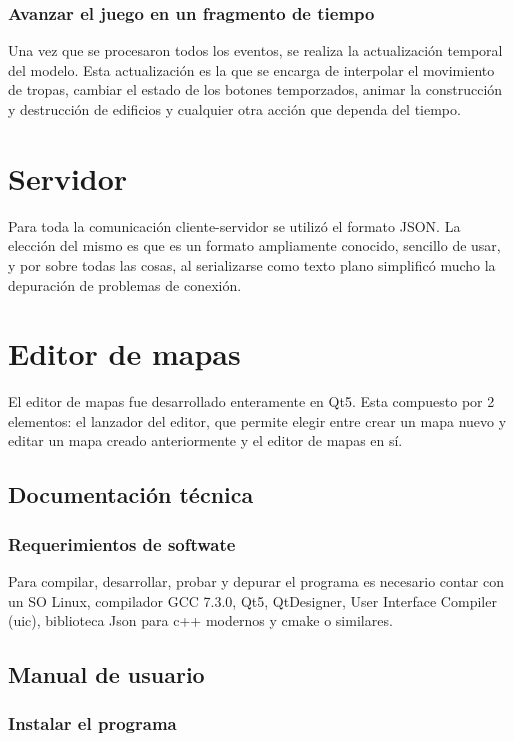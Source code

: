 \documentclass[titlepage,a4paper,12pt]{article}
\begin{document}
\subsubsection{Avanzar el juego en un fragmento de tiempo}
Una vez que se procesaron todos los eventos, se realiza la actualización temporal del modelo. Esta actualización es la que se encarga de interpolar el movimiento de tropas, cambiar el estado de los botones temporzados, animar la construcción y destrucción de edificios y cualquier otra acción que dependa del tiempo.

\newpage
\section{Servidor}
Para toda la comunicación cliente-servidor se utilizó el formato JSON. La elección del mismo es que es un formato ampliamente conocido, sencillo de usar, y por sobre todas las cosas, al serializarse como texto plano simplificó mucho la depuración de problemas de conexión.

\newpage
\section{Editor de mapas}

El editor de mapas fue desarrollado enteramente en Qt5. Esta compuesto por 2 elementos: el lanzador del editor, que permite elegir entre crear un mapa nuevo y editar un mapa creado anteriormente y el editor de mapas en sí. 

\subsection{Documentación técnica}

\subsubsection{Requerimientos de softwate}
Para compilar, desarrollar, probar y depurar el programa es necesario contar con un SO Linux, compilador GCC 7.3.0, Qt5, QtDesigner, User Interface Compiler (uic), biblioteca Json para c++ modernos y cmake o similares.\\

\subsection{Manual de usuario}

\subsubsection{Instalar el programa}
\end{document}
